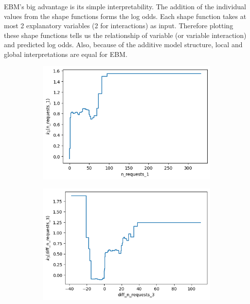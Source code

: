 \documentclass[12pt,titlepage]{article}
\begin{document}
EBM's big advantage is its simple interpretability. The addition of the individual values from the shape functions forms the log odds. Each shape function takes at most 2 explanatory variables (2 for interactions) as input. Therefore plotting these shape functions tells us the relationship of variable (or variable interaction) and predicted log odds. Also, because of the additive model structure, local and global interpretations are equal for EBM. \\
\begin{figure}[H]
    \centering
        \begin{subfigure}{.55\textwidth}
          \centering
          \includegraphics[width=1\linewidth]{shape_function_n_requests_1.png}
        \end{subfigure}%
        \begin{subfigure}{.55\textwidth}
          \centering
          \includegraphics[width=1\linewidth]{shape_function_diff_n_requests_3.png}

\end{subfigure}
\end{figure}
\end{document}
